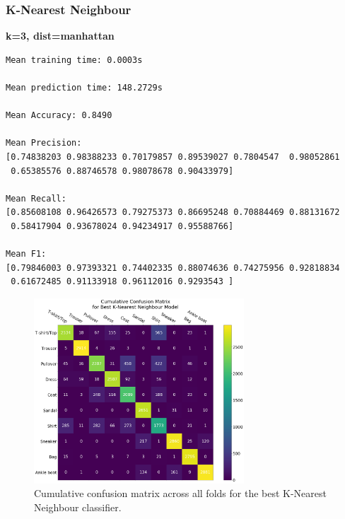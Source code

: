 \documentclass[11pt,a4paper]{article}
\begin{document}
\pagebreak

\subsubsection*{K-Nearest Neighbour}
\textbf{k=3, dist=manhattan}
\begin{verbatim}
Mean training time: 0.0003s

Mean prediction time: 148.2729s

Mean Accuracy: 0.8490

Mean Precision:
[0.74838203 0.98388233 0.70179857 0.89539027 0.7804547  0.98052861
 0.65385576 0.88746578 0.98078678 0.90433979]

Mean Recall:
[0.85608108 0.96426573 0.79275373 0.86695248 0.70884469 0.88131672
 0.58417904 0.93678024 0.94234917 0.95588766]

Mean F1:
[0.79846003 0.97393321 0.74402335 0.88074636 0.74275956 0.92818834
 0.61672485 0.91133918 0.96112016 0.9293543 ]
\end{verbatim}

\begin{figure}[H]
    \centering
    \includegraphics[width=0.7\textwidth]{img/conf_mat_knn.png}
    \caption{Cumulative confusion matrix across all folds for the best K-Nearest Neighbour classifier.}
    \label{fig:conf_mat_knn}
\end{figure}

\pagebreak
\end{document}
